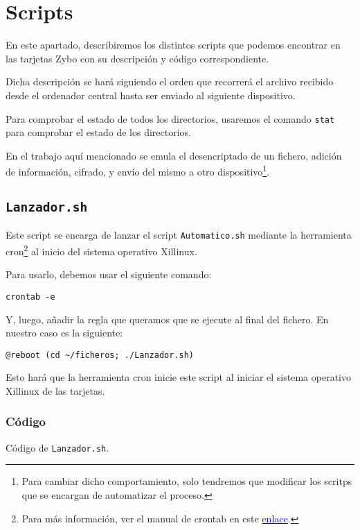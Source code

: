 \documentclass[12pt,letterpaper]{article}
\begin{document}
\section{Scripts}
En este apartado, describiremos los distintos scripts que podemos encontrar en las tarjetas Zybo con su descripción y código correspondiente.

Dicha descripción se hará siguiendo el orden que recorrerá el archivo recibido desde el ordenador central hasta ser enviado al siguiente dispositivo.

Para comprobar el estado de todos los directorios, usaremos el comando \texttt{stat} para comprobar el estado de los directorios.

En el trabajo aquí mencionado se emula el desencriptado de un fichero, adición de información, cifrado, y envío del mismo a otro dispositivo\footnote{Para cambiar dicho comportamiento, solo tendremos que modificar los scritps que se encargan de automatizar el proceso.}.


\subsection{\texttt{Lanzador.sh}}
Este script se encarga de lanzar el script \texttt{Automatico.sh} mediante la herramienta cron\footnote{Para más información, ver el manual de crontab en este \href{https://linux.die.net/man/5/crontab}{\textcolor{blue}{enlace}}.} al inicio del sistema operativo Xillinux.

Para usarlo, debemos usar el siguiente comando:
\begin{center}
	\texttt{crontab -e}
\end{center}

Y, luego, añadir la regla que queramos que se ejecute al final del fichero. En nuestro caso es la siguiente:
\begin{center}
	\texttt{@reboot (cd \textasciitilde/ficheros; ./Lanzador.sh)}
\end{center}

Esto hará que la herramienta cron inicie este script al iniciar el sistema operativo Xillinux de las tarjetas.
\subsubsection{Código}

\begin{center}
	Código de \texttt{Lanzador.sh}.
\end{center}
\end{document}
